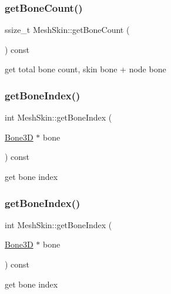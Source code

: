\subsubsection{\texorpdfstring{get\+Bone\+Count()}{getBoneCount()}\hspace{0.1cm}{\footnotesize\ttfamily [2/2]}}
{\footnotesize\ttfamily ssize\+\_\+t Mesh\+Skin\+::get\+Bone\+Count (\begin{DoxyParamCaption}{ }\end{DoxyParamCaption}) const}

get total bone count, skin bone + node bone \mbox{\label{classMeshSkin_a79b2269d85ee8b9cda3e35126cda511f}} 
\subsubsection{\texorpdfstring{get\+Bone\+Index()}{getBoneIndex()}\hspace{0.1cm}{\footnotesize\ttfamily [1/2]}}
{\footnotesize\ttfamily int Mesh\+Skin\+::get\+Bone\+Index (\begin{DoxyParamCaption}\item[{\hyperlink{classBone3D}{Bone3D} $\ast$}]{bone }\end{DoxyParamCaption}) const}

get bone index \mbox{\label{classMeshSkin_a79b2269d85ee8b9cda3e35126cda511f}} 
\subsubsection{\texorpdfstring{get\+Bone\+Index()}{getBoneIndex()}\hspace{0.1cm}{\footnotesize\ttfamily [2/2]}}
{\footnotesize\ttfamily int Mesh\+Skin\+::get\+Bone\+Index (\begin{DoxyParamCaption}\item[{\hyperlink{classBone3D}{Bone3D} $\ast$}]{bone }\end{DoxyParamCaption}) const}

get bone index \mbox{\label{classMeshSkin_aaafc6c9736be6dcab5f26e6a6bde79e7}} 
